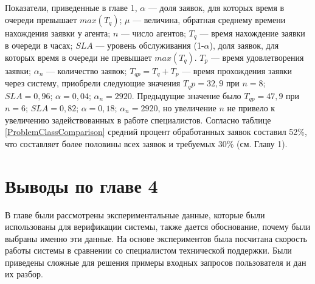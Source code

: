   
Показатели, приведенные в главе 1, $\alpha$ --- доля заявок, для которых время в очереди превышает $max(T_q)$;       
$\mu$ --- величина, обратная среднему времени нахождения заявки у агента;
$n$ --- число агентов;
$T_q$ --- время нахождение заявки в очереди в часах;
$SLA$ --- уровень обслуживания (1-$\alpha$), доля заявок, для которых время в очереди не превышает $max(T_q)$. $T_p$ --- время удовлетворения заявки;
 $\alpha_n$ --- количество заявок;
 $T_{qp}=T_q+T_p$ --- время прохождения заявки через систему,
 приобрели следующие значения $T_qp=32,9$ при $n=8$; $SLA=0,96$; $\alpha=0,04$;  $\alpha_n=2920$.  Предыдущие значение было $T_{qp}=47,9$ при $n=6$; $SLA=0,82$; $\alpha=0,18$;  $\alpha_n=2920$, но увеличение $n$ не привело к увеличению задействованных в работе специалистов. Согласно таблице \ref{ProblemClassComparison} средний процент обработанных заявок составил 52\%, что составляет более половины всех заявок и требуемых 30\% (см. Главу 1).

  
\section{Выводы по главе 4}
В главе были рассмотрены экспериментальные данные, которые были использованы для верификации системы, также дается обоснование, почему были выбраны именно эти данные. На основе экспериментов была посчитана скорость работы системы в сравнении со специалистом технической поддержки. Были приведены сложные для решения примеры входных запросов пользователя и дан их разбор. 


\clearpage